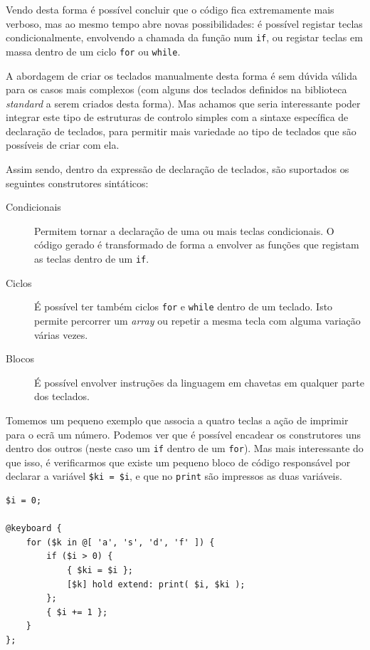 Vendo desta forma é possível concluir que o código fica extremamente mais verboso, mas ao mesmo tempo abre novas possibilidades: é possível registar teclas condicionalmente, envolvendo a chamada da função num \texttt{if}, ou registar teclas em massa dentro de um ciclo \texttt{for} ou \texttt{while}.

A abordagem de criar os teclados manualmente desta forma é sem dúvida válida para os casos mais complexos (com alguns dos teclados definidos na biblioteca \textit{standard} a serem criados desta forma). Mas achamos que seria interessante poder integrar este tipo de estruturas de controlo simples com a sintaxe específica de declaração de teclados, para permitir mais variedade ao tipo de teclados que são possíveis de criar com ela.

Assim sendo, dentro da expressão de declaração de teclados, são suportados os seguintes construtores sintáticos:
\begin{description}
 \item[Condicionais] Permitem tornar a declaração de uma ou mais teclas condicionais. O código gerado é transformado de forma a envolver as funções que registam as teclas dentro de um \texttt{if}.
 \item[Ciclos] É possível ter também ciclos \texttt{for} e \texttt{while} dentro de um teclado. Isto permite percorrer um \textit{array} ou repetir a mesma tecla com alguma variação várias vezes.
 \item[Blocos] É possível envolver instruções da linguagem em chavetas em qualquer parte dos teclados.
\end{description}

Tomemos um pequeno exemplo que associa a quatro teclas a ação de imprimir para o ecrã um número. Podemos ver que é possível encadear os construtores uns dentro dos outros (neste caso um \texttt{if} dentro de um \texttt{for}). Mas mais interessante do que isso, é verificarmos que existe um pequeno bloco de código responsável por declarar a variável \texttt{\$ki = \$i}, e que no \texttt{print} são impressos as duas variáveis.

\begin{lstlisting}[caption={Declaração de teclado dinâmica recorrendo ao uso de ciclos, condicionais e blocos de código.}]
$i = 0;

@keyboard {
    for ($k in @[ 'a', 's', 'd', 'f' ]) {
        if ($i > 0) {
            { $ki = $i };
            [$k] hold extend: print( $i, $ki );
        };
        { $i += 1 };
    }
};
\end{lstlisting}

